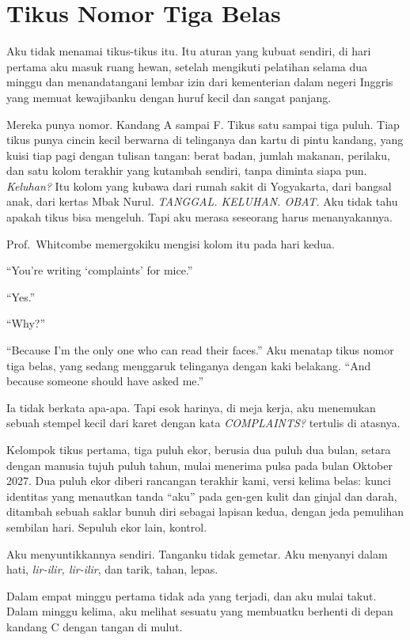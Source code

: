 \documentclass[11pt,twoside,openany]{book}
\makeatletter
\newcommand{\scenebreak}{\par\vspace{0.9em}{\centering\textsc{*\hspace{0.7em}*\hspace{0.7em}*}\par}\vspace{0.9em}\@afterindentfalse\@afterheading}
\makeatother
\begin{document}
\chapter{Tikus Nomor Tiga Belas}
Aku tidak menamai tikus-tikus itu. Itu aturan yang kubuat sendiri, di hari pertama aku masuk ruang hewan, setelah mengikuti pelatihan selama dua minggu dan menandatangani lembar izin dari kementerian dalam negeri Inggris yang memuat kewajibanku dengan huruf kecil dan sangat panjang.

Mereka punya nomor. Kandang A sampai F. Tikus satu sampai tiga puluh. Tiap tikus punya cincin kecil berwarna di telinganya dan kartu di pintu kandang, yang kuisi tiap pagi dengan tulisan tangan: berat badan, jumlah makanan, perilaku, dan satu kolom terakhir yang kutambah sendiri, tanpa diminta siapa pun. \emph{Keluhan?} Itu kolom yang kubawa dari rumah sakit di Yogyakarta, dari bangsal anak, dari kertas Mbak Nurul. \emph{TANGGAL. KELUHAN. OBAT.} Aku tidak tahu apakah tikus bisa mengeluh. Tapi aku merasa seseorang harus menanyakannya.

Prof.~Whitcombe memergokiku mengisi kolom itu pada hari kedua.

``You're writing `complaints' for mice.''

``Yes.''

``Why?''

``Because I'm the only one who can read their faces.'' Aku menatap tikus nomor tiga belas, yang sedang menggaruk telinganya dengan kaki belakang. ``And because someone should have asked me.''

Ia tidak berkata apa-apa. Tapi esok harinya, di meja kerja, aku menemukan sebuah stempel kecil dari karet dengan kata \emph{COMPLAINTS?} tertulis di atasnya.

\scenebreak
Kelompok tikus pertama, tiga puluh ekor, berusia dua puluh dua bulan, setara dengan manusia tujuh puluh tahun, mulai menerima pulsa pada bulan Oktober 2027. Dua puluh ekor diberi rancangan terakhir kami, versi kelima belas: kunci identitas yang menautkan tanda ``aku'' pada gen-gen kulit dan ginjal dan darah, ditambah sebuah saklar bunuh diri sebagai lapisan kedua, dengan jeda pemulihan sembilan hari. Sepuluh ekor lain, kontrol.

Aku menyuntikkannya sendiri. Tanganku tidak gemetar. Aku menyanyi dalam hati, \emph{lir-ilir, lir-ilir}, dan tarik, tahan, lepas.

Dalam empat minggu pertama tidak ada yang terjadi, dan aku mulai takut. Dalam minggu kelima, aku melihat sesuatu yang membuatku berhenti di depan kandang C dengan tangan di mulut.
\end{document}
